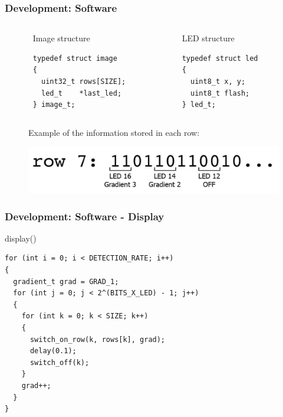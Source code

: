 \documentclass{beamer}
\begin{document}
\begin{frame}[fragile]
\frametitle{Development: Software}

\begin{columns}

\begin{column}{0.025\textwidth}
\end{column}

\begin{column}{0.45\textwidth}
\begin{block}{Image structure}
\begin{verbatim}
typedef struct image
{
  uint32_t rows[SIZE];
  led_t    *last_led; 
} image_t;
\end{verbatim}
\end{block}
\end{column}

\begin{column}{0.05\textwidth}
\end{column}

\begin{column}{0.45\textwidth}
\begin{block}{LED structure}
\begin{verbatim}
typedef struct led
{
  uint8_t x, y;
  uint8_t flash;
} led_t;
\end{verbatim}
\end{block}
\end{column}

\begin{column}{0.025\textwidth}
\end{column}

\end{columns}

\begin{figure}
	\begin{flushleft}
		Example of the information stored in each row:
	\end{flushleft}
	\includegraphics[scale=0.26]{images/row_example.jpg}
\end{figure}

\end{frame}

\begin{frame}[fragile]
\frametitle{Development: Software - Display}

\begin{block}{display()}
\begin{verbatim}
for (int i = 0; i < DETECTION_RATE; i++)
{
  gradient_t grad = GRAD_1;
  for (int j = 0; j < 2^(BITS_X_LED) - 1; j++)
  {
    for (int k = 0; k < SIZE; k++)
    {
      switch_on_row(k, rows[k], grad);
      delay(0.1);
      switch_off(k);
    }
    grad++;
  }
} 
\end{verbatim}
\end{block}


\end{frame}
\end{document}

